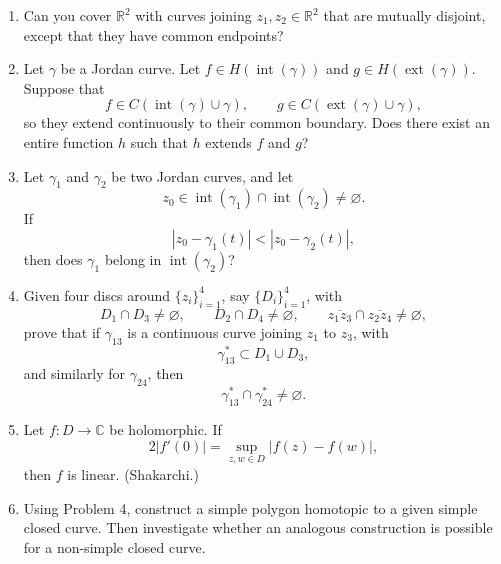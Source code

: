 \documentclass[11pt,a4paper]{article}
\begin{document}
\begin{enumerate}
  \item Can you cover \(\mathbb R^2\) with curves joining \(z_1,z_2\in\mathbb R^2\) that are mutually disjoint, except that they have common endpoints?

  \item Let \(\gamma\) be a Jordan curve. Let \(f\in H(\operatorname{int}(\gamma))\) and \(g\in H(\operatorname{ext}(\gamma))\). Suppose that
  \[
    f\in C(\operatorname{int}(\gamma)\cup\gamma),
    \qquad
    g\in C(\operatorname{ext}(\gamma)\cup\gamma),
  \]
  so they extend continuously to their common boundary. Does there exist an entire function \(h\) such that \(h\) extends \(f\) and \(g\)?

  \item Let \(\gamma_1\) and \(\gamma_2\) be two Jordan curves, and let
  \[
    z_0\in\operatorname{int}(\gamma_1)\cap\operatorname{int}(\gamma_2)\ne\varnothing.
  \]
  If
  \[
    |z_0-\gamma_1(t)|<|z_0-\gamma_2(t)|,
  \]
  then does \(\gamma_1\) belong in \(\operatorname{int}(\gamma_2)\)?

  \item Given four discs around \(\{z_i\}_{i=1}^4\), say \(\{D_i\}_{i=1}^4\), with
  \[
    D_1\cap D_3\ne\varnothing,
    \qquad
    D_2\cap D_4\ne\varnothing,
    \qquad
    \overline{z_1z_3}\cap\overline{z_2z_4}\ne\varnothing,
  \]
  prove that if \(\gamma_{13}\) is a continuous curve joining \(z_1\) to \(z_3\), with
  \[
    \gamma_{13}^*\subset D_1\cup D_3,
  \]
  and similarly for \(\gamma_{24}\), then
  \[
    \gamma_{13}^*\cap\gamma_{24}^*\ne\varnothing.
  \]

  \item Let \(f:D\to\mathbb C\) be holomorphic. If
  \[
    2|f'(0)|=\sup_{z,w\in D}|f(z)-f(w)|,
  \]
  then \(f\) is linear. (Shakarchi.)

  \item Using Problem 4, construct a simple polygon homotopic to a given simple closed curve. Then investigate whether an analogous construction is possible for a non-simple closed curve.
\end{enumerate}
\end{document}
